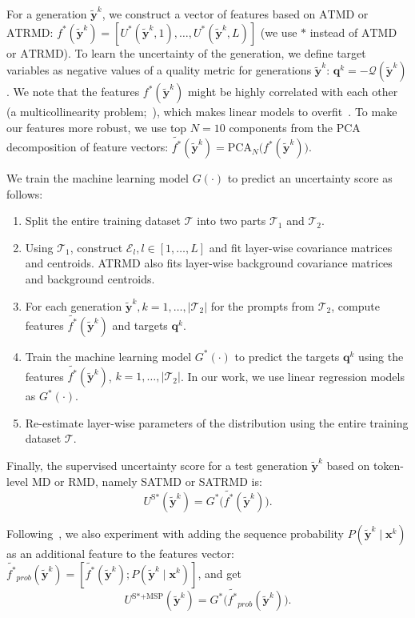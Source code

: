 \documentclass[11pt]{article}
\newcommand{\xv}{\mathbf{x}}
\newcommand{\qv}{\mathbf{q}}
\newcommand{\yv}{\mathbf{y}}
\newcommand{\TC}{\mathcal{T}}
\newcommand{\EC}{\mathcal{E}}
\newcommand{\QC}{\mathcal{Q}}
\begin{document}
  For a generation $\tilde{\yv}^k$, we construct a vector of features based on $\text{ATMD}$ or $\text{ATRMD}$: $f^{*}(\tilde{\yv}^k)=[U^{*}(\tilde{\yv}^k, 1), \dots, U^{*}(\tilde{\yv}^k, L)]$ (we use $*$ instead of $\text{ATMD}$ or $\text{ATRMD}$). To learn the uncertainty of the generation, we define target variables as negative values of a quality metric for generations $\tilde{\yv}^k$: $\qv^k= - \QC(\tilde{\yv}^k)$. We note that the features $f^{*}(\tilde{\yv}^k)$ might be highly correlated with each other (a multicollinearity problem;~\citet{multicollinearity}), which makes linear models to overfit~\cite{mitigating_multicollinearity}. To make our features more robust, we use top $N=10$ components from the PCA decomposition of feature vectors: $\tilde{f^{*}}(\tilde{\yv}^k) = \text{PCA}_N \bigl(f^{*}(\tilde{\yv}^k)\bigr)$.

  We train the machine learning model $G(\cdot)$ to predict an uncertainty score as follows:
  \begin{enumerate}[topsep=0pt,itemsep=-1ex,partopsep=1ex,parsep=1ex]
    \item Split the entire training dataset $\TC$ into two parts $\TC_1$ and $\TC_2$.
    \item Using $\TC_1$, construct $\EC_l, l \in [1, \dots, L]$ and fit layer-wise covariance matrices and centroids. ATRMD also fits layer-wise background covariance matrices and background centroids.
    \item For each generation $\tilde{\yv}^k, k = 1, \dots, |\TC_2|$ for the prompts from $\TC_2$, compute features $\tilde{f^{*}}(\tilde{\yv}^k)$ and targets $\qv^k$.
    \item Train the machine learning model $G^{*}(\cdot)$ to predict the targets $\qv^k$ using the features $\tilde{f^{*}}(\tilde{\yv}^k)$, $k = 1, \dots, |\TC_2|$. In our work, we use linear regression models as $G^{*}(\cdot)$.
    \item Re-estimate layer-wise parameters of the distribution using the entire training dataset $\TC$.
  \end{enumerate}

  Finally, the supervised uncertainty score for a test generation $\tilde{\yv}^k$ based on token-level MD or RMD, namely SATMD or SATRMD is:
  \begin{equation*}
    U^{\text{S*}}(\tilde{\yv}^k) = G^{*}\bigl(\tilde{f^{*}}(\tilde{\yv}^k)\bigr).
  \end{equation*}

  Following~\citet{he-etal-2024-llm}, we also experiment with adding the sequence probability $P(\tilde{\yv}^k \mid \xv^k)$ as an additional feature to the features vector: $\tilde{f^{*}}_{prob}(\tilde{\yv}^k) = [\tilde{f^{*}}(\tilde{\yv}^k); P(\tilde{\yv}^k \mid \xv^k)]$, and get
  \begin{equation*}
    U^{\text{S*+MSP}}(\tilde{\yv}^k) = G^{*}\bigl(\tilde{f^{*}}_{prob}(\tilde{\yv}^k)\bigr).
  \end{equation*}
\end{document}
